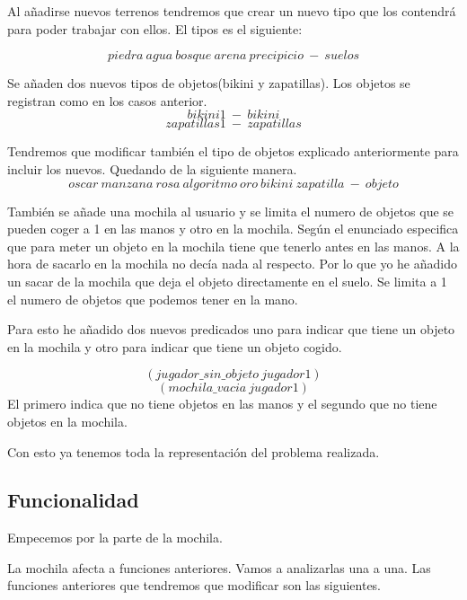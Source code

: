 \documentclass[]{article}
\begin{document}
Al añadirse nuevos terrenos tendremos que crear un nuevo tipo que los contendrá para poder trabajar con ellos. El tipos es el siguiente: 

$$
piedra\ agua\ bosque\ arena\ precipicio\ -\ suelos
$$

Se añaden dos nuevos tipos de objetos(bikini y zapatillas). Los objetos se registran como en los casos anterior. 
$$
bikini1\ -\ bikini
$$
$$
zapatillas1\ -\ zapatillas
$$

Tendremos que modificar también el tipo de objetos explicado anteriormente para incluir los nuevos. Quedando de la siguiente manera.
$$
oscar\ manzana\ rosa\ algoritmo\ oro\ bikini\ zapatilla\ -\ objeto
$$

También se añade una mochila al usuario y se limita el numero de objetos que se pueden coger a 1 en las manos y otro en la mochila. Según el enunciado especifica que para meter un objeto en la mochila tiene que tenerlo antes en las manos. A la hora de sacarlo en la mochila no decía nada al respecto. Por lo que yo he añadido un sacar de la mochila que deja el objeto directamente en el suelo. Se limita a 1 el numero de objetos que podemos tener en la mano. 

Para esto he añadido dos nuevos predicados uno para indicar que tiene un objeto en la mochila y otro para indicar que tiene un objeto cogido.

$$
(jugador\_sin\_objeto\ jugador1)
$$
$$
(mochila\_vacia\ jugador1)
$$
El primero indica que no tiene objetos en las manos y el segundo que no tiene objetos en la mochila.

Con esto ya tenemos toda la representación del problema realizada. 

\subsection{Funcionalidad}
Empecemos por la parte de la mochila. 

La mochila afecta a funciones anteriores. Vamos a analizarlas una a una.
Las funciones anteriores que tendremos que modificar son las siguientes.
\end{document}

